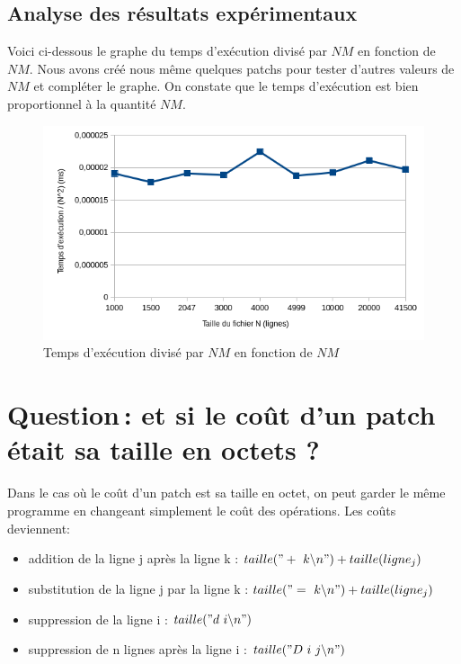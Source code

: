 \documentclass[a4paper, 10pt, french]{article}
\begin{document}
\subsection{Analyse des résultats expérimentaux}

Voici ci-dessous le graphe du temps d'exécution divisé par $NM$ en fonction de $NM$.
Nous avons créé nous même quelques patchs pour tester d'autres valeurs de $NM$ et compléter le graphe.
On constate que le temps d'exécution est bien proportionnel à la quantité $NM$.


\begin{figure}[h!]
\begin{center}
\includegraphics[width=12cm]{exec.png}
\caption{Temps d'exécution divisé par $NM$ en fonction de $NM$}
\end{center}
\end{figure}

\section{Question\,: et  si le coût d'un patch était sa taille en octets ?}
    Dans le cas où le coût d'un patch est sa taille en octet,
on peut garder le même programme en changeant simplement le coût des opérations.
Les coûts deviennent:

\begin{itemize}
\item addition de la ligne j après la ligne k : $taille("+\ k\backslash n") + taille(ligne_j)$
\item substitution de la ligne j par la ligne k : $taille("=\ k\backslash n") + taille(ligne_j)$
\item suppression de la ligne i : $taille("d\ i\backslash n")$
\item suppression de n lignes après la ligne i : $taille("D\ i\ j\backslash n")$
\end{itemize}

\end{document}
